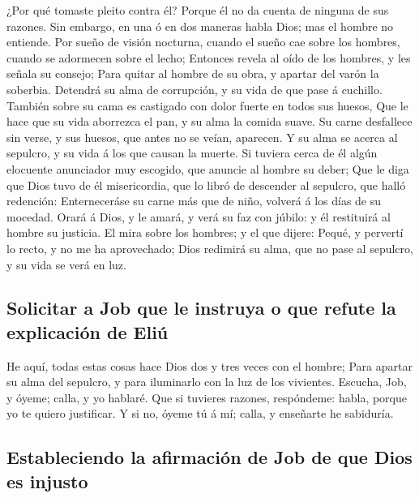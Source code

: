  ¿Por qué tomaste pleito contra él? Porque él no da cuenta
de ninguna de sus razones.  Sin embargo, en una ó en dos
maneras habla Dios; mas el hombre no entiende.  Por sueño
de visión nocturna, cuando el sueño cae sobre los hombres, cuando se
adormecen sobre el lecho;  Entonces revela al oído de los
hombres, y les señala su consejo;  Para quitar al hombre de
su obra, y apartar del varón la soberbia.  Detendrá su alma
de corrupción, y su vida de que pase á cuchillo.  También
sobre su cama es castigado con dolor fuerte en todos sus huesos,
 Que le hace que su vida aborrezca el pan, y su alma la
comida suave.  Su carne desfallece sin verse, y sus huesos,
que antes no se veían, aparecen.  Y su alma se acerca al
sepulcro, y su vida á los que causan la muerte.  Si tuviera
cerca de él algún elocuente anunciador muy escogido, que anuncie al
hombre su deber;  Que le diga que Dios tuvo de él
misericordia, que lo libró de descender al sepulcro, que halló
redención:  Enterneceráse su carne más que de niño, volverá
á los días de su mocedad.  Orará á Dios, y le amará, y verá
su faz con júbilo: y él restituirá al hombre su justicia. 
El mira sobre los hombres; y el que dijere: Pequé, y pervertí lo recto,
y no me ha aprovechado;  Dios redimirá su alma, que no pase
al sepulcro, y su vida se verá en luz.

\hypertarget{solicitar-a-job-que-le-instruya-o-que-refute-la-explicaciuxf3n-de-eliuxfa}{%
\subsection{Solicitar a Job que le instruya o que refute la explicación
de
Eliú}\label{solicitar-a-job-que-le-instruya-o-que-refute-la-explicaciuxf3n-de-eliuxfa}}

 He aquí, todas estas cosas hace Dios dos y tres veces con
el hombre;  Para apartar su alma del sepulcro, y para
iluminarlo con la luz de los vivientes.  Escucha, Job, y
óyeme; calla, y yo hablaré.  Que si tuvieres razones,
respóndeme: habla, porque yo te quiero justificar.  Y si
no, óyeme tú á mí; calla, y enseñarte he sabiduría.

\hypertarget{estableciendo-la-afirmaciuxf3n-de-job-de-que-dios-es-injusto}{%
\subsection{Estableciendo la afirmación de Job de que Dios es
injusto}\label{estableciendo-la-afirmaciuxf3n-de-job-de-que-dios-es-injusto}}

